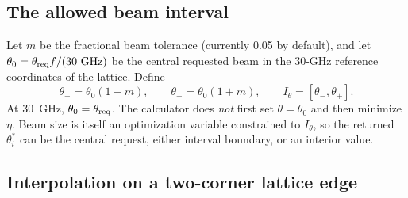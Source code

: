 \documentclass[11pt]{article}
\begin{document}
\subsection{The allowed beam interval}

Let $m$ be the fractional beam tolerance (currently 0.05 by default), and let
$\theta_0=\theta_{\rm req}f/(30~{\rm GHz})$ be the central requested beam in
the 30-GHz reference coordinates of the lattice.  Define
\begin{equation}
 \theta_- = \theta_0(1-m),\qquad
 \theta_+ = \theta_0(1+m),\qquad
 I_\theta=[\theta_-,\theta_+].
 \label{eq:beam-window}
\end{equation}
At 30~GHz, $\theta_0=\theta_{\rm req}$.  The calculator does \emph{not}
first set $\theta=\theta_0$ and then minimize $\eta$.  Beam size is itself an
optimization variable constrained to $I_\theta$, so the returned
$\theta_i^*$ can be the central request, either interval boundary, or an
interior value.

\subsection{Interpolation on a two-corner lattice edge}
\end{document}

